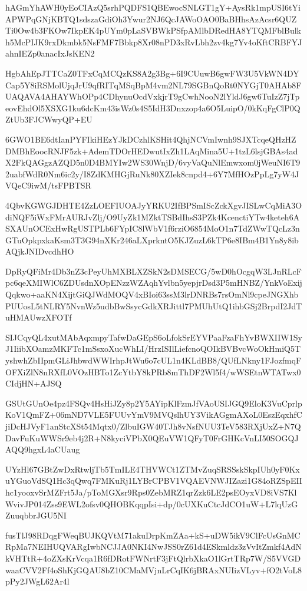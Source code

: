 \documentclass[]{article}
\newenvironment{Shaded}{\begin{snugshade}}{\end{snugshade}}
\newcommand{\NormalTok}[1]{#1}
\begin{document}
\begin{Shaded}
\begin{Highlighting}[]
\NormalTok{hAGmYhAWH0yEoCIAzQ5srhPQDFS1QBEwocSNLGT1gY+AysRk1mpUSI6tYiAPWPqGNjKBTQ1sdszaGdiOh3Ywur2NJ6QcJAWoOAO0BaBHhsAzAcsr6QUZTi0Ow4b3FKOw7IkpEK4pUYm0pLaSVBWkPSfpAMlbDRedHA8YTQMFblBulkh5McPIJK9rxDkmbk5NsFMF7Bbkp8Xr08nPD3xRvLbh2zv4kg7Yv4oKftCRBFYJahnIEZp0anacIxJsKEN2}

\NormalTok{HgbAhEpJTTCaZ0TFxCqMCQzKS8A2g3Bg+6I9CUuwB6gwFW3U5VkWN4DYCap5Y8iRSMolUjqJrU9qfRITqMSqBpM4vm2NL79SGBnQoRt0NYGjT0AHAb8FUAQAVA4AHAYWhOPp4CDhynuOcdVxkjrT9gCwhNooN2lYldJ6gw6TuIzZ7jTpeovEhdOl5XSXG1ku6dcKm43isWz0s4S5IdH3Dnxzop4a6O5LuipO/0kKqFgClP0QZtUb3FJCWwyQP+EU}

\NormalTok{6GWO1BE6dtIanPYFIkiHEzYJkDCzhlKSHit4QhjNCVmIwnh9SJXTcqeQHzHZDMBhEoocRNJF5zk+AdemTDOrHEDwutIxZh1LAqMina5U+1tzL6lsjGBAs4adX2FkQAGgzAZQD5n0D4BMYIw2WS30WnjD/6vyVaQuNlEmwxom0jWeuNI6T92uabfWdR0Nm6ic2y/I8ZdKMHGjRuNk80XZIek8cnpd4+6Y7MfHOzPpLg7yW4JVQeC9iwM/tsFPBTSR}

\NormalTok{4QbvKGWGJDHTE4ZzLOEFIUOAJyYRKU2IfBPSmIScZckXgvJISLwCqMiA3OdiNQF5iWxFMrAURJvZlj/O9UyZk1MZktTSBdIhsS3PZk4KcenctiYTw4keteh6ASXAUnOCExHwRgUSTPLb6FYpIC8lWbV1f6rziO6854MoO1n7TdZWwTQcLz3nGTuOpkpxkaKsm3T3G94nXKr246aLXprkntO5KJZuzL6kTP6e8IBm4B1Yn8y8ibAQjkJNIDvcdhHO}

\NormalTok{DpRyQFiMr4Db3nZ3cPeyUhMXBLXZSkN2sDMSECG/5wD0hOcgqW3LJnRLcFpc6qeXMIWlC6ZDUsdnXOpENzzWZAqhYvlbn5yepjrDsd3P5mHNBZ/YnkVoExijQqkwo+aaKN4XijtGiQJWdMOQV4xBIoi63ssM3lrDNRBs7rsOmNl9cpeJNGXhbPUUosL5tNLRY5NvnWz5udbBwSsycGdkXRJittl7PMUhUtQ1ihbGSj2BrpdI2JdTuHMAUwzXFOTf}

\NormalTok{SIJCqyQL4xutMAbAqxmpyTafwDaGEpS6oLfokSrEYVPaaFzaFhYvBWXIIW1SyJ1IiibXOamzMKFTc1mSsxoXucWhLI/HrzISIlLiefcnoQOIkBVBvcWoOkHmiQ5TyshwhZbIIpmGLiJhbwdWWIrhpJtWu6o7cUL1n4KLdBB8/QUfLNkny1FJozfmqFOFXiZlN8nRXfL0VOzHBTo1ZcYtbY8kPRb8mThDF2Wl5f4/wWSEtnWTATwx0CIdjHN+AJSQ}

\NormalTok{GSUtGUnOe4pz4FSQv4HsHiJZy8p2Y5AYipKlFzmJfVAoUSIJGQ9EloK3VuCprlpKoV1QmFZ+06mND7VLE5FUUvYmV9MVQslhUY3VikAGgmAXoL0EszEqxhfCjiDcHJVyF1anStcXSt54Mqtx0/ZlbuIGW40TJh8vNsfNUU3TeV583RXjUxZ+N7QDavFuKuWWSr9eb4j2R+N8kyciVPbX0QEuVW1QFyT0FrGHKcVnLI50SOGQJAQQ9hgxL4aCUaug}

\NormalTok{UYzHl67GBtZwDxRtwljTb5TmILE4THVWCt1ZTMvZuqSRSSskSkpIUh0yF0KxuYGuoVdSQ1Hc3qQwq7FMKuRj1LYBrCPBV1VQAEVNWJIZazi1G84oRZSpEIIhc1yooxvSrMZFrt5Ja/pToMGXsr9Rps0ZebMRZ1qrZzk6LE2psEOyxVD8iVS7KlWvivJP014Zss9EWL2ofsv0QHOBKqqpIsi+dp/0cUXKuCtcJdCO1uW+L7lqUzGZuuqbbrJGU5NI}

\NormalTok{fusTlJ98RDqgFWeqBUJKQVtM71akuDrpKmZAa+kS+uDW5ikV9ClFcUsGnMCRpMa7NEIHUQVARgIwbNCJJA0NKI4NwJSS0rZ61d4ESkmldz3zVvItZmkf4AdNkVHTtR+4oZXsKrVcqa1R6fDRotFWNrtF3jFtQlrbXkaO1lGrtTRp7W/S5VVGDwaaCVV2Ff4oShKjGQAU8bZ10CMaMVjnLrCqIK6jBRAxNUIizVLyv+fO2tVoL8pPy2JWgL62Ar4l}


\end{Highlighting}
\end{Shaded}
\end{document}
